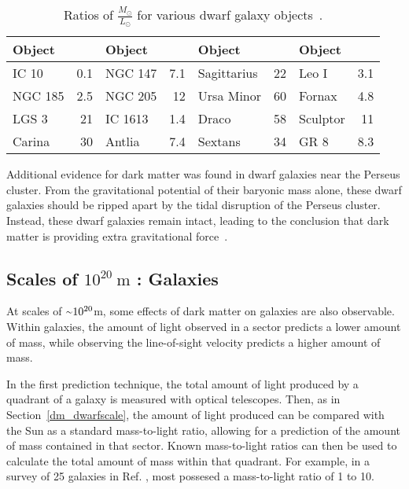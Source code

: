 \begin{table}[h]
  \centering
  \caption[Ratios of $\frac{\textrm{M}_\odot}{\textrm{L}_\odot}$ for Various Dwarf Galaxy Objects]{
    Ratios of $\frac{M_\odot}{L_\odot}$ for various dwarf galaxy objects~\cite{localdwarfs}.
  }
  \label{tab:mlratios:dwarfgals}
  \begin{tabular}{l r | l r | l r | l r}
    Object      &  \mlratio{} & Object & \mlratio{} & Object & \mlratio{} & Object & \mlratio{} \\
    \hline
    IC 10       &  0.1 & NGC 147    &  7.1 & Sagittarius & 22 & Leo I    &  3.1 \\
    NGC 185     &  2.5 & NGC 205    & 12   & Ursa Minor  & 60 & Fornax   &  4.8 \\
    LGS 3       & 21   & IC 1613    &  1.4 & Draco       & 58 & Sculptor & 11   \\
    Carina      & 30   & Antlia     &  7.4 & Sextans     & 34 & GR 8     &  8.3 \\
  \end{tabular}
\end{table}
    
Additional evidence for dark matter was found in dwarf galaxies near the Perseus cluster.
From the gravitational potential of their baryonic mass alone, these dwarf galaxies should be ripped apart by the tidal disruption of the Perseus cluster.
Instead, these dwarf galaxies remain intact, leading to the conclusion that dark matter is providing extra gravitational force~\cite{Penny2009}.

\FloatBarrier

\subsection{Scales of $10^{20}\:\text{m}$ : Galaxies}\label{dm_gal}
%
At scales of $\nicetilde 10^{20}$m, some effects of dark matter on galaxies are also observable.
Within galaxies, the amount of light observed in a sector predicts a lower amount of mass, while observing the line-of-sight velocity predicts a higher amount of mass.

In the first prediction technique, the total amount of light produced by a quadrant of a galaxy is measured with optical telescopes.
Then, as in Section~\ref{dm_dwarfscale}, the amount of light produced can be compared with the Sun as a standard mass-to-light ratio, allowing for a prediction of the amount of mass contained in that sector.
Known mass-to-light ratios can then be used to calculate the total amount of mass within that quadrant.
For example, in a survey of 25 galaxies in Ref. \cite{galaxy_mass_light_ratio}, most possesed a mass-to-light ratio of 1 to 10.

